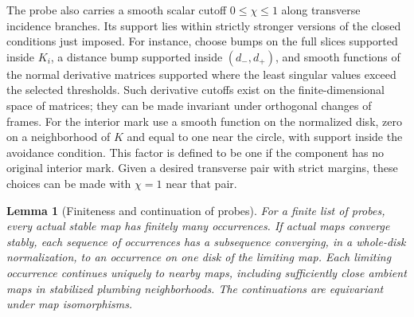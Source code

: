 \documentclass[11pt]{article}
\newtheorem{lemma}[theorem]{Lemma}
\theoremstyle{definition}
\theoremstyle{remark}
\numberwithin{equation}{section}
\begin{document}
The probe also carries a smooth scalar cutoff $0\le\chi\le1$ along
transverse incidence branches.  Its support lies within strictly stronger
versions of the closed conditions just imposed.  For instance, choose
bumps on the full slices supported inside $K_i$, a distance bump supported
inside $(d_-,d_+)$, and smooth functions of the normal derivative matrices
supported where the least singular values exceed the selected
thresholds.  Such derivative cutoffs exist on the finite-dimensional
space of matrices; they can be made invariant under orthogonal changes
of frames.  For the interior mark use a smooth function on the normalized
disk, zero on a neighborhood of $K$ and equal to one near the circle,
with support inside the avoidance condition.  This factor is defined to
be one if the component has no original interior mark.  Given a desired
transverse pair with strict margins, these choices can be made with
$\chi=1$ near that pair.

\begin{lemma}[Finiteness and continuation of probes]\label{virt:probes}
For a finite list of probes, every actual stable map has finitely many
occurrences.  If actual maps converge stably, each sequence of occurrences
has a subsequence converging, in a whole-disk normalization, to an
occurrence on one disk of the limiting map.  Each limiting occurrence
continues uniquely to nearby maps, including sufficiently close ambient
maps in stabilized plumbing neighborhoods.  The continuations are
equivariant under map isomorphisms.
\end{lemma}
\end{document}
